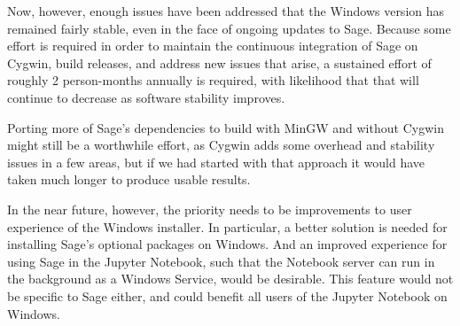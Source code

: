 Now, however, enough issues have been addressed that the Windows version has
remained fairly stable, even in the face of ongoing updates to Sage. Because
some effort is required in order to maintain the continuous integration of Sage
on Cygwin, build releases, and address new issues that arise, a sustained
effort of roughly 2 person-months annually is required, with likelihood that
that will continue to decrease as software stability improves.

Porting more of Sage's dependencies to build with MinGW and without Cygwin
might still be a worthwhile effort, as Cygwin adds some overhead and stability
issues in a few areas, but if we had started with that approach it would have
taken much longer to produce usable results.

In the near future, however, the priority needs to be improvements to
user experience of the Windows installer. In particular, a better
solution is needed for installing Sage's optional packages on Windows.
And an improved experience for using Sage in the Jupyter Notebook, such
that the Notebook server can run in the background as a Windows Service,
would be desirable. This feature would not be specific to Sage either, and
could benefit all users of the Jupyter Notebook on Windows.
